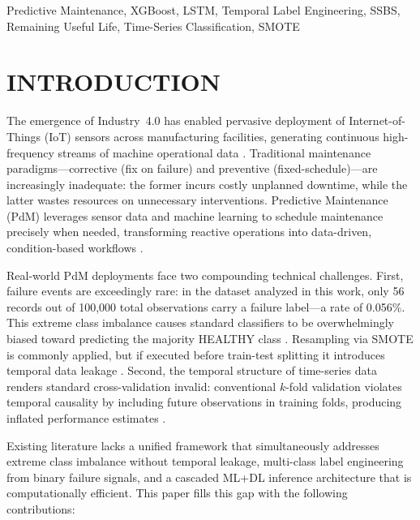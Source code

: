 \documentclass[conference]{IEEEtran}
\begin{document}
\begin{IEEEkeywords}
Predictive Maintenance, XGBoost, LSTM, Temporal Label Engineering, SSBS,
Remaining Useful Life, Time-Series Classification, SMOTE
\end{IEEEkeywords}

\section{INTRODUCTION}

The emergence of Industry~4.0 has enabled pervasive deployment of
Internet-of-Things (IoT) sensors across manufacturing facilities, generating
continuous high-frequency streams of machine operational data
\cite{lee2014industryiot}. Traditional maintenance paradigms---corrective
(fix on failure) and preventive (fixed-schedule)---are increasingly
inadequate: the former incurs costly unplanned downtime, while the latter
wastes resources on unnecessary interventions. Predictive Maintenance (PdM)
leverages sensor data and machine learning to schedule maintenance precisely
when needed, transforming reactive operations into data-driven,
condition-based workflows \cite{zhang2019pdmsurvey}.

Real-world PdM deployments face two compounding technical challenges. First,
failure events are exceedingly rare: in the dataset analyzed in this work,
only 56 records out of 100,000 total observations carry a failure label---a
rate of 0.056\%. This extreme class imbalance causes standard classifiers to
be overwhelmingly biased toward predicting the majority HEALTHY class
\cite{chawla2002smote}. Resampling via SMOTE \cite{chawla2002smote} is
commonly applied, but if executed before train-test splitting it introduces
temporal data leakage \cite{kaufman2012leakage}. Second, the temporal
structure of time-series data renders standard cross-validation invalid:
conventional $k$-fold validation violates temporal causality by including
future observations in training folds, producing inflated performance
estimates \cite{bergmeir2018tscv}.

Existing literature lacks a unified framework that simultaneously addresses
extreme class imbalance without temporal leakage, multi-class label
engineering from binary failure signals, and a cascaded ML+DL inference
architecture that is computationally efficient. This paper fills this gap with
the following contributions:
\end{document}

